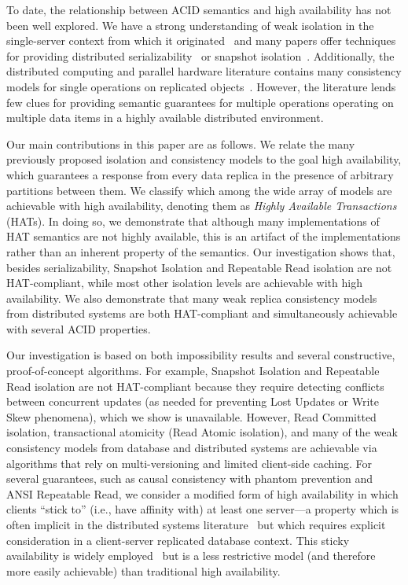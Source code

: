 To date, the relationship between ACID semantics and high
availability has not been well explored. We have a strong
understanding of weak isolation in the single-server context from
which it originated~\cite{adya, ansicritique, gray-isolation} and many
papers offer techniques for providing distributed
serializability~\cite{bernstein-book, spanner, daudjee-session,
  hstore, calvin} or snapshot
isolation~\cite{kemme-thesis,walter}. Additionally, the distributed computing and parallel
hardware literature contains many consistency models for single
operations on replicated objects~\cite{pnuts, herlihy-art, eiger, cac,
  sessionguarantees}. However, the literature lends few clues for
providing semantic guarantees for multiple operations operating on
multiple data items in a highly available distributed environment.

Our main contributions in this paper are as follows. We relate the
many previously proposed isolation and consistency models to the goal
high availability, which guarantees a response from every data replica
in the presence of arbitrary partitions between them.  We classify
which among the wide array of models are achievable with high
availability, denoting them as {\em Highly Available Transactions}
(HATs). In doing so, we demonstrate that although many implementations
of HAT semantics are not highly available, this is an artifact of the
implementations rather than an inherent property of the semantics. Our
investigation shows that, besides serializability, Snapshot Isolation
and Repeatable Read isolation are not HAT-compliant, while most other
isolation levels are achievable with high availability. We also
demonstrate that many weak replica consistency models from distributed
systems are both HAT-compliant and simultaneously achievable with
several ACID properties.

Our investigation is based on both impossibility results and several
constructive, proof-of-concept algorithms. For example, Snapshot
Isolation and Repeatable Read isolation are not HAT-compliant because
they require detecting conflicts between concurrent updates (as needed
for preventing Lost Updates or Write Skew phenomena), which we show is
unavailable. However, Read Committed isolation, transactional
atomicity (Read Atomic isolation), and many of the weak consistency
models from database and distributed systems are achievable via
algorithms that rely on multi-versioning and limited client-side
caching. For several guarantees, such as causal consistency with
phantom prevention and ANSI Repeatable Read, we consider a modified
form of high availability in which clients ``stick to'' (i.e., have
affinity with) at least one server---a property which is often
implicit in the distributed systems literature~\cite{herlihy-art,
  eiger, cac} but which requires explicit consideration in a
client-server replicated database context. This sticky availability is
widely employed~\cite{eiger, vogels-defs} but is a less restrictive
model (and therefore more easily achievable) than traditional high
availability.

